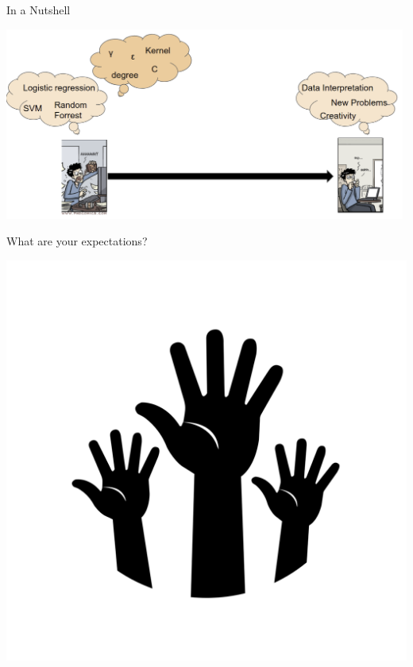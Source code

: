 \begin{frame}[c]{In a Nutshell}

\includegraphics[width=0.99\textwidth]{images/automl_comic}

\end{frame}
\begin{frame}[c]{}

\huge
\centering
What are your expectations?

\bigskip

\includegraphics[scale=0.1]{images/hands.png}

\end{frame}
